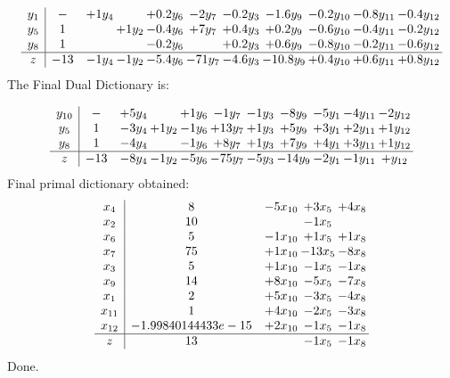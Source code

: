 \documentclass[11pt]{article}
\begin{document}
\[\begin{array}{c| c c@{\hskip 2pt} c@{\hskip 2pt} c@{\hskip 2pt} c@{\hskip 2pt} c@{\hskip 2pt} c@{\hskip 2pt} c@{\hskip 2pt} c@{\hskip 2pt} c@{\hskip 2pt} }
 y_{1}   &  - & + 1 y_{4} &   & + 0.2 y_{6} & -2 y_{7} & -0.2 y_{3} & -1.6 y_{9} & -0.2 y_{10} & -0.8 y_{11} & -0.4 y_{12}\\
 y_{5}   &  1  &   & + 1 y_{2} & -0.4 y_{6} & + 7 y_{7} & + 0.4 y_{3} & + 0.2 y_{9} & -0.6 y_{10} & -0.4 y_{11} & -0.2 y_{12}\\
 y_{8}   &  1  &    &   & -0.2 y_{6} &   & + 0.2 y_{3} & + 0.6 y_{9} & -0.8 y_{10} & -0.2 y_{11} & -0.6 y_{12}\\
\hline
z    &  -13 & -1 y_{4} & -1 y_{2} & -5.4 y_{6} & -71 y_{7} & -4.6 y_{3} & -10.8 y_{9} & + 0.4 y_{10} & + 0.6 y_{11} & + 0.8 y_{12}\\
\end{array}\]
The Final Dual Dictionary is: 

\[\begin{array}{c| c c@{\hskip 2pt} c@{\hskip 2pt} c@{\hskip 2pt} c@{\hskip 2pt} c@{\hskip 2pt} c@{\hskip 2pt} c@{\hskip 2pt} c@{\hskip 2pt} c@{\hskip 2pt} }
 y_{10}   &  - & + 5 y_{4} &   & + 1 y_{6} & -1 y_{7} & -1 y_{3} & -8 y_{9} & -5 y_{1} & -4 y_{11} & -2 y_{12}\\
 y_{5}   &  1 & -3 y_{4} & + 1 y_{2} & -1 y_{6} & + 13 y_{7} & + 1 y_{3} & + 5 y_{9} & + 3 y_{1} & + 2 y_{11} & + 1 y_{12}\\
 y_{8}   &  1 & -4 y_{4} &   & -1 y_{6} & + 8 y_{7} & + 1 y_{3} & + 7 y_{9} & + 4 y_{1} & + 3 y_{11} & + 1 y_{12}\\
\hline
z    &  -13 & -8 y_{4} & -1 y_{2} & -5 y_{6} & -75 y_{7} & -5 y_{3} & -14 y_{9} & -2 y_{1} & -1 y_{11} & +  y_{12}\\
\end{array}\]
 Final primal dictionary obtained: 
\[\begin{array}{c| c c@{\hskip 2pt} c@{\hskip 2pt} c@{\hskip 2pt} }
 x_{4}   &  8 & -5 x_{10} & + 3 x_{5} & + 4 x_{8}\\
 x_{2}   &  10  &   & -1 x_{5} &   \\
 x_{6}   &  5 & -1 x_{10} & + 1 x_{5} & + 1 x_{8}\\
 x_{7}   &  75 & + 1 x_{10} & -13 x_{5} & -8 x_{8}\\
 x_{3}   &  5 & + 1 x_{10} & -1 x_{5} & -1 x_{8}\\
 x_{9}   &  14 & + 8 x_{10} & -5 x_{5} & -7 x_{8}\\
 x_{1}   &  2 & + 5 x_{10} & -3 x_{5} & -4 x_{8}\\
 x_{11}   &  1 & + 4 x_{10} & -2 x_{5} & -3 x_{8}\\
 x_{12}   &  -1.99840144433e-15 & + 2 x_{10} & -1 x_{5} & -1 x_{8}\\
\hline
z    &  13  &   & -1 x_{5} & -1 x_{8}\\
\end{array}\]
Done.
\end{document}
